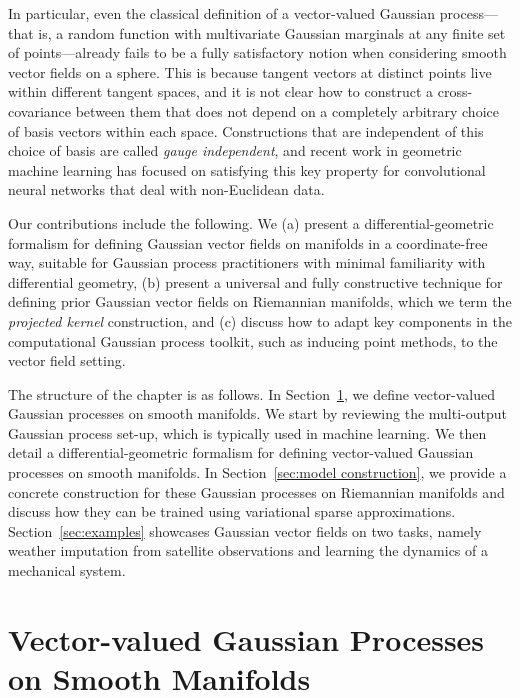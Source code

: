 In particular, even the classical definition of a vector-valued Gaussian process---that is, a random function with multivariate Gaussian marginals at any finite set of points---already fails to be a fully satisfactory notion when considering smooth vector fields on a sphere.
This is because tangent vectors at distinct points live within different tangent spaces, and it is not clear how to construct a cross-covariance between them that does not depend on a completely arbitrary choice of basis vectors within each space.
Constructions that are independent of this choice of basis are called \emph{gauge independent}, and recent work \cite{weiler2021coordinate,cohen2019gauge,haan2021gauge} in geometric machine learning has focused on satisfying this key property for convolutional neural networks that deal with non-Euclidean data.

Our contributions include the following.
We (a) present a differential-geometric formalism for defining Gaussian vector fields on manifolds in a coordinate-free way, suitable for Gaussian process practitioners with minimal familiarity with differential geometry, (b) present a universal and fully constructive technique for defining prior Gaussian vector fields on Riemannian manifolds, which we term the \emph{projected kernel} construction, and (c) discuss how to adapt key components in the computational Gaussian process toolkit, such as inducing point methods, to the vector field setting.

The structure of the chapter is as follows.
In Section~\ref{sec:gp}, we define vector-valued Gaussian processes on smooth manifolds.
We start by reviewing the multi-output Gaussian process set-up, which is typically used in machine learning.
We then detail a differential-geometric formalism for defining vector-valued Gaussian processes on smooth manifolds.
In Section~\ref{sec:model construction}, we provide a concrete construction for these Gaussian processes on Riemannian manifolds and discuss how they can be trained using variational sparse approximations.
Section~\ref{sec:examples} showcases Gaussian vector fields on two tasks, namely weather imputation from satellite observations and learning the dynamics of a mechanical system.

\section{Vector-valued Gaussian Processes on Smooth Manifolds}
\label{sec:gp}


